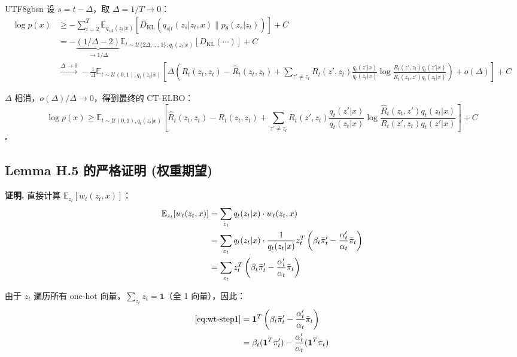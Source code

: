 \documentclass[11pt,a4paper]{article}
\newcommand{\Dkl}{D_{\mathrm{KL}}}
\begin{document}
\begin{CJK}{UTF8}{gbsn}
设 $s = t - \Delta$，取 $\Delta = 1/T \to 0$：
\begin{align*}
\log p(x) &\geq -\sum_{i=2}^{T} \mathbb{E}_{q_{i\Delta}(z_t|x)} \left[ \Dkl(q_{s|t}(z_s|z_t, x) \| p_\theta(z_s|z_t)) \right] + C \\
&= -\underbrace{(1/\Delta - 2)}_{\to 1/\Delta} \mathbb{E}_{t \sim \mathcal{U}\{2\Delta, \ldots, 1\}, q_t(z_t|x)} \left[ \Dkl(\cdots) \right] + C \\
&\xrightarrow{\Delta \to 0} -\frac{1}{\Delta} \mathbb{E}_{t \sim \mathcal{U}(0,1), q_t(z_t|x)} \left[ \Delta \left( R_t(z_t, z_t) - \hat{R}_t(z_t, z_t) + \sum_{z' \neq z_t} R_t(z', z_t) \frac{q_t(z'|x)}{q_t(z_t|x)} \log \frac{R_t(z', z_t) q_t(z'|x)}{\hat{R}_t(z_t, z') q_t(z_t|x)} \right) + o(\Delta) \right] + C
\end{align*}

$\Delta$ 相消，$o(\Delta)/\Delta \to 0$，得到最终的 CT-ELBO：
\[
\log p(x) \geq \mathbb{E}_{t \sim \mathcal{U}(0,1), q_t(z_t|x)} \left[ \hat{R}_t(z_t, z_t) - R_t(z_t, z_t) + \sum_{z' \neq z_t} R_t(z', z_t) \frac{q_t(z'|x)}{q_t(z_t|x)} \log \frac{\hat{R}_t(z_t, z') q_t(z_t|x)}{R_t(z', z_t) q_t(z'|x)} \right] + C
\]
\hfill $\square$

\subsection{Lemma H.5 的严格证明 (权重期望)}

\textbf{证明.} 直接计算 $\mathbb{E}_{z_t}[w_t(z_t, x)]$：
\begin{align}
\mathbb{E}_{z_t}[w_t(z_t, x)] &= \sum_{z_t} q_t(z_t|x) \cdot w_t(z_t, x) \notag \\
&= \sum_{z_t} q_t(z_t|x) \cdot \frac{1}{q_t(z_t|x)} z_t^T \left(\beta_t \bar{\pi}_t' - \frac{\alpha_t'}{\alpha_t}\bar{\pi}_t\right) \notag \\
&= \sum_{z_t} z_t^T \left(\beta_t \bar{\pi}_t' - \frac{\alpha_t'}{\alpha_t}\bar{\pi}_t\right) \label{eq:wt-step1}
\end{align}

由于 $z_t$ 遍历所有 one-hot 向量，$\sum_{z_t} z_t = \mathbf{1}$（全 1 向量），因此：
\begin{align}
\eqref{eq:wt-step1} &= \mathbf{1}^T \left(\beta_t \bar{\pi}_t' - \frac{\alpha_t'}{\alpha_t}\bar{\pi}_t\right) \notag \\
&= \beta_t (\mathbf{1}^T \bar{\pi}_t') - \frac{\alpha_t'}{\alpha_t} (\mathbf{1}^T \bar{\pi}_t) \label{eq:wt-step2}
\end{align}


\end{CJK}
\end{document}
